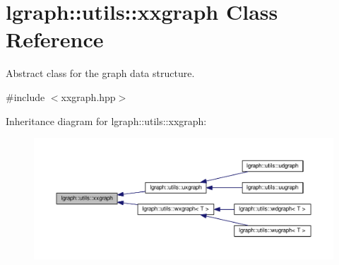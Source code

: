 \hypertarget{classlgraph_1_1utils_1_1xxgraph}{}\section{lgraph\+:\+:utils\+:\+:xxgraph Class Reference}
\label{classlgraph_1_1utils_1_1xxgraph}


Abstract class for the graph data structure.  




{\ttfamily \#include $<$xxgraph.\+hpp$>$}



Inheritance diagram for lgraph\+:\+:utils\+:\+:xxgraph\+:\nopagebreak
\begin{figure}[H]
\begin{center}
\leavevmode
\includegraphics[width=350pt]{classlgraph_1_1utils_1_1xxgraph__inherit__graph}
\end{center}
\end{figure}
